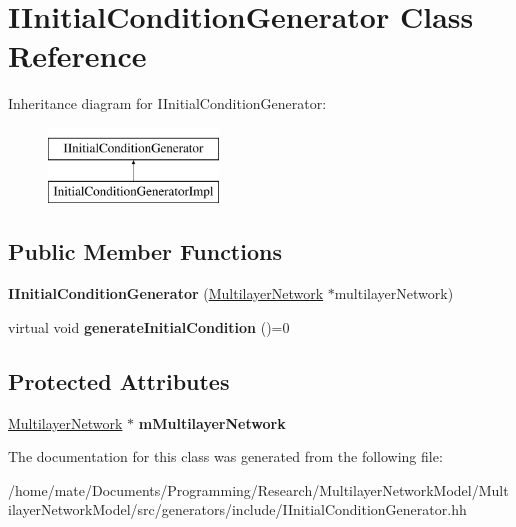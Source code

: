 \hypertarget{classIInitialConditionGenerator}{}\section{I\+Initial\+Condition\+Generator Class Reference}
\label{classIInitialConditionGenerator}
Inheritance diagram for I\+Initial\+Condition\+Generator\+:\begin{figure}[H]
\begin{center}
\leavevmode
\includegraphics[height=2.000000cm]{classIInitialConditionGenerator}
\end{center}
\end{figure}
\subsection*{Public Member Functions}
\begin{DoxyCompactItemize}
\item 
{\bfseries I\+Initial\+Condition\+Generator} (\hyperlink{classMultilayerNetwork}{Multilayer\+Network} $\ast$multilayer\+Network)\hypertarget{classIInitialConditionGenerator_a23bef59a851914a65f67c2bd7736ad37}{}\label{classIInitialConditionGenerator_a23bef59a851914a65f67c2bd7736ad37}

\item 
virtual void {\bfseries generate\+Initial\+Condition} ()=0\hypertarget{classIInitialConditionGenerator_aaee78296548634e00150023baa051e52}{}\label{classIInitialConditionGenerator_aaee78296548634e00150023baa051e52}

\end{DoxyCompactItemize}
\subsection*{Protected Attributes}
\begin{DoxyCompactItemize}
\item 
\hyperlink{classMultilayerNetwork}{Multilayer\+Network} $\ast$ {\bfseries m\+Multilayer\+Network}\hypertarget{classIInitialConditionGenerator_a7144fdc9973103d6b377958868b4b387}{}\label{classIInitialConditionGenerator_a7144fdc9973103d6b377958868b4b387}

\end{DoxyCompactItemize}


The documentation for this class was generated from the following file\+:\begin{DoxyCompactItemize}
\item 
/home/mate/\+Documents/\+Programming/\+Research/\+Multilayer\+Network\+Model/\+Multilayer\+Network\+Model/src/generators/include/I\+Initial\+Condition\+Generator.\+hh\end{DoxyCompactItemize}
